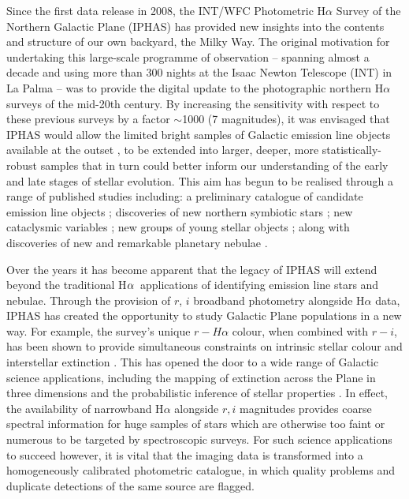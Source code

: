 \documentclass[useAMS,usenatbib]{mn2e}
\def\ha{\mbox{H$\rm \alpha$}}
\begin{document}
Since the first data release in 2008, 
the INT/WFC Photometric H$\alpha$ Survey 
of the Northern Galactic Plane (IPHAS)
has provided new insights into the contents and structure 
of our own backyard, the Milky Way. 
The original motivation for undertaking 
this large-scale programme of observation
-- spanning almost a decade 
and using more than 300 nights 
at the Isaac Newton Telescope (INT) in La Palma -- 
was to provide the digital update 
to the photographic northern H$\alpha$ surveys 
of the mid-20th century. 
By increasing the sensitivity 
with respect to these previous surveys 
by a factor $\sim$1000 (7 magnitudes), 
it was envisaged that IPHAS would allow 
the limited bright samples of Galactic emission line objects 
available at the outset \citep[e.g.][]{Kohoutek1999}, 
to be extended into larger, deeper, more statistically-robust samples 
that in turn could better inform our understanding 
of the early and late stages of stellar evolution. 
This aim has begun to be realised through a
range of published studies including: 
a preliminary catalogue of candidate emission line objects \citep{Witham2008};
discoveries of new northern symbiotic stars \citep{Corradi2008, Corradi2010}; 
new cataclysmic variables \citep{Witham2007}; 
new groups of young stellar objects \citep{Vink2008,Barentsen2011a};
along with discoveries of new and remarkable planetary nebulae 
\citep{Mampaso2006, Corradi2011, Viironen2011}.

Over the years it has become apparent that the legacy of IPHAS 
will extend beyond the traditional \ha\ applications 
of identifying emission line stars and nebulae. 
Through the provision of $r$, $i$ broadband photometry 
alongside H$\alpha$ data,
IPHAS has created the opportunity 
to study Galactic Plane populations 
in a new way.
For example, the survey’s unique $r-H\alpha$ colour, 
when combined with $r-i$,
has been shown to provide simultaneous constraints 
on intrinsic stellar colour and interstellar extinction \citep{Drew2008}. 
This has opened the door 
to a wide range of Galactic science applications, 
including the mapping of extinction across the Plane in three dimensions
and the probabilistic inference of stellar properties
\citep{Sale2009, Sale2010, Giammanco2011, Sale2012, Barentsen2013}. 
In effect, the availability of narrowband H$\alpha$ 
alongside $r, i$ magnitudes
provides coarse spectral information for huge samples of stars 
which are otherwise too faint or numerous 
to be targeted by spectroscopic surveys.
For such science applications to succeed however, 
it is vital that the imaging data is transformed 
into a homogeneously calibrated photometric catalogue, 
in which quality problems 
and duplicate detections of the same source 
are flagged. 
\end{document}
